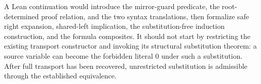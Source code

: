 A Lean continuation would introduce the mirror-guard predicate,
the root-determined proof relation, and the two syntax translations,
then formalize safe right expansion, shared-left implication, the
substitution-free induction construction, and the formula composites.
It should not start by restricting the existing transport constructor
and invoking its structural substitution theorem: a source variable
can become the forbidden literal $0$ under such a substitution.
After full transport has been recovered, unrestricted substitution
is admissible through the established equivalence.
